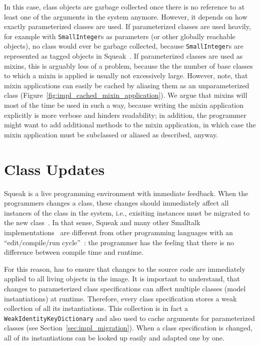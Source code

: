 In this case, class objects are garbage collected once there is no reference to at least one of the arguments in the system anymore. However, it depends on how exactly parameterized classes are used. If parameterized classes are used heavily, for example with \texttt{SmallInteger}s as parameters (or other globally reachable objects), no class would ever be garbage collected, because \texttt{SmallInteger}s are represented as tagged objects in Squeak~\cite{Bolz:2008:BFO:1482373.1482382, papetechreport}. If parameterized classes are used as mixins, this is arguably less of a problem, because the the number of base classes to which a mixin is applied is usually not excessively large. However, note, that mixin applications can easily be cached by aliasing them as an unparameterized class (Figure~\ref{fig:impl_cached_mixin_application}). We argue that mixins will most of the time be used in such a way, because writing the mixin application explicitly is more verbose and hinders readability; in addition, the programmer might want to add additional methods to the mixin application, in which case the mixin application must be subclassed or aliased as described, anyway.

\section{Class Updates}
Squeak is a live programming environment with immediate feedback. When the programmers changes a class, these changes should immediately affect all instances of the class in the system, i.e., exisiting instances must be migrated to the new class~\cite{casaccio2011bootstrapping}. In that sense, Squeak and many other Smalltalk implementations~\cite{Penney:1987:CMG:38765.38817} are different from other programming languages with an ``edit/compile/run cycle''~\cite{conf/sofsem/NierstraszG10}: the programmer has the feeling that there is no difference between compile time and runtime.

For this reason, \msname has to ensure that changes to the source code are immediately applied to all living objects in the image. It is important to understand, that changes to parameterized class specifications can affect multiple classes (model instantiations) at runtime. Therefore, every class specification stores a weak collection of all its instantiations. This collection is in fact a \texttt{WeakIdentityKeyDictionary} and also used to cache arguments for parameterized classes (see Section~\ref{sec:impl_migration}). When a class specification is changed, all of its instantiations can be looked up easily and adapted one by one.

